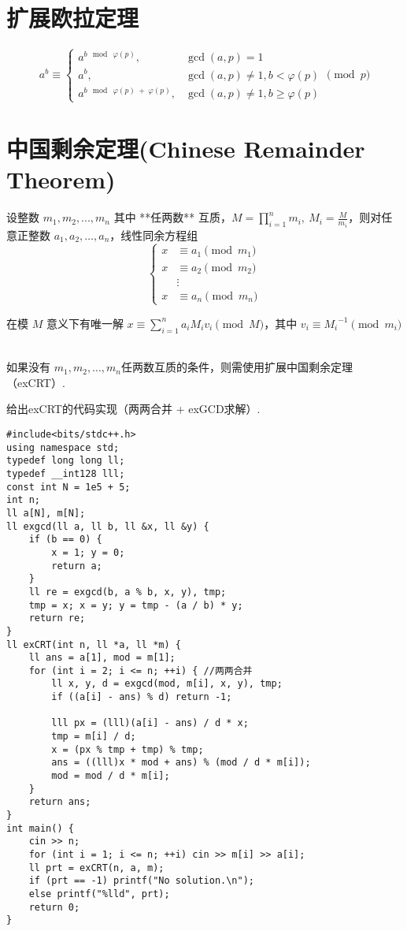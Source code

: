 \section{扩展欧拉定理}
$$
a^b\equiv \begin{cases} a^{b\ \bmod\ \varphi(p)},&\gcd(a,p)=1\\ a^b,&\gcd(a,p)\ne1,b<\varphi(p)\\ a^{b\ \bmod\ \varphi(p)\ +\ \varphi(p)},&\gcd(a,p)\ne1,b\ge\varphi(p) \end{cases} \pmod p
$$

\section{中国剩余定理(Chinese Remainder Theorem)}
\par \noindent 设整数 $m_1,m_2,...,m_n$ 其中 **任两数** 互质，$M = \prod_{i = 1}^nm_i,\ M_i = \frac{M}{m_i}$，则对任意正整数 $a_1, a_2, \dots, a_n$，线性同余方程组
$$
\begin{cases} 
    x &\equiv a_1 \pmod {m_1} \\ x &\equiv a_2 \pmod {m_2} \\ &\vdots \\ x &\equiv a_n \pmod {m_n} 
\end{cases}
$$
\par \noindent 在模 $M$ 意义下有唯一解 $x \equiv \sum_{i = 1}^{n} a_iM_iv_i \pmod M$，其中 $v_i \equiv {M_i}^{-1} \pmod {m_i}$
~\\
\par \noindent 如果没有 $m_1,m_2,...,m_n$任两数互质的条件，则需使用扩展中国剩余定理（exCRT）.
~\\
\par \noindent 给出exCRT的代码实现（两两合并 + exGCD求解）.
\begin{verbatim}
#include<bits/stdc++.h>
using namespace std;
typedef long long ll;
typedef __int128 lll;
const int N = 1e5 + 5;
int n;
ll a[N], m[N];
ll exgcd(ll a, ll b, ll &x, ll &y) {
    if (b == 0) {
        x = 1; y = 0;
        return a;
    }
    ll re = exgcd(b, a % b, x, y), tmp;
    tmp = x; x = y; y = tmp - (a / b) * y;
    return re;
}
ll exCRT(int n, ll *a, ll *m) {
    ll ans = a[1], mod = m[1];
    for (int i = 2; i <= n; ++i) { //两两合并
        ll x, y, d = exgcd(mod, m[i], x, y), tmp;
        if ((a[i] - ans) % d) return -1;

        lll px = (lll)(a[i] - ans) / d * x;
        tmp = m[i] / d;
        x = (px % tmp + tmp) % tmp;
        ans = ((lll)x * mod + ans) % (mod / d * m[i]);
        mod = mod / d * m[i];
    }
    return ans;
}
int main() {
    cin >> n;
    for (int i = 1; i <= n; ++i) cin >> m[i] >> a[i];
    ll prt = exCRT(n, a, m);
    if (prt == -1) printf("No solution.\n");
    else printf("%lld", prt);
    return 0;
}
\end{verbatim}


